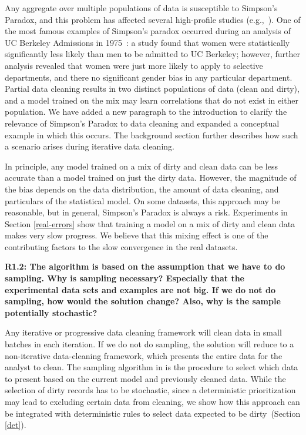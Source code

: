 \noindent Any aggregate over multiple populations of data is susceptible to Simpson's Paradox, and this problem has affected several high-profile studies (e.g.,~\cite{bickel1975sex, charig1986comparison}).
One of the most famous examples of Simpson's paradox occurred during an analysis of UC Berkeley Admissions in 1975~\cite{bickel1975sex}: a study found that women were statistically significantly less likely than men to be admitted to UC Berkeley; however, further analysis revealed that women were just more likely to apply to selective departments, and there no significant gender bias in any particular department. 
Partial data cleaning results in two distinct populations of data (clean and dirty), and a model trained on the mix may learn correlations that do not exist in either population. 
We have added a new paragraph to the introduction to clarify the relevance of Simpson's Paradox to data cleaning and expanded a conceptual example in which this occurs.
The background section further describes how such a scenario arises during iterative data cleaning.

In principle, any model trained on a mix of dirty and clean data can be less accurate than a model trained on just the dirty data.
However, the magnitude of the bias depends on the data distribution, the amount of data cleaning, and particulars of the statistical model.
On some datasets, this approach may be reasonable, but in general, Simpson's Paradox is always a risk.
Experiments in Section \ref{real-errors} show that training a model on a mix of dirty and clean data makes very slow progress. 
We believe that this mixing effect is one of the contributing factors to the slow convergence in the real datasets.

\vspace{0.5em}

\noindent\textbf{R1.2: The algorithm is based on the assumption that we have to do sampling. Why is sampling necessary? Especially that the experimental data sets and examples are not big. If we do not do sampling, how would the solution change? Also, why is the sample potentially stochastic?}

\noindent Any iterative or progressive data cleaning framework will clean data in small batches in each iteration. 
If we do not do sampling, the solution will reduce to a non-iterative data-cleaning framework, which presents the entire data for the analyst to clean.
The sampling algorithm in \sys is the procedure to select which data to present based on the current model and previously cleaned data.
While the selection of dirty records has to be stochastic, since a deterministic prioritization may lead to excluding certain data from cleaning, we show how this approach can be integrated with deterministic rules to select data expected to be dirty~(Section \ref{det}).

